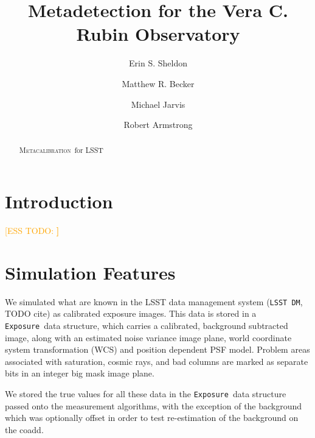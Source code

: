 \documentclass[iop, twocolappendix, appendixfloats, numberedappendix, apj]{hackemulateapj}
\newcommand{\esstodo}[1]{\textcolor{orange}{[ESS TODO: \bf #1]}}
\newcommand{\calexp}{\texttt{Exposure}}
\newcommand{\dm}{\texttt{LSST DM}}
\newcommand{\Mcal}{\textsc{Metacalibration}}
\newcommand{\Mdet}{\textsc{Metadetection}}
\begin{document}



\title{Metadetection for the Vera C. Rubin Observatory}

\author{Erin S. Sheldon}
\author{Matthew R. Becker}
\author{Michael Jarvis}
\author{Robert Armstrong}


\begin{abstract}

    \Mcal\ for LSST

\end{abstract}


\section{Introduction} \label{sec:intro}

\esstodo{}

\section{Simulation Features} \label{sec:sim}

We simulated what are known in the LSST data management system (\dm, TODO cite)
as calibrated exposure images.  This data is stored in a \calexp\ data
structure, which carries a calibrated, background subtracted image, along with
an estimated noise variance image plane, world coordinate system transformation
(WCS) and position dependent PSF model.  Problem areas associated with
saturation, cosmic rays, and bad columns are marked as separate bits in an
integer big mask image plane.

We stored the true values for all these data in the \calexp\ data structure
passed onto the measurement algorithms, with the exception of the background
which was optionally offset in order to test re-estimation of the
background on the coadd.
\end{document}
